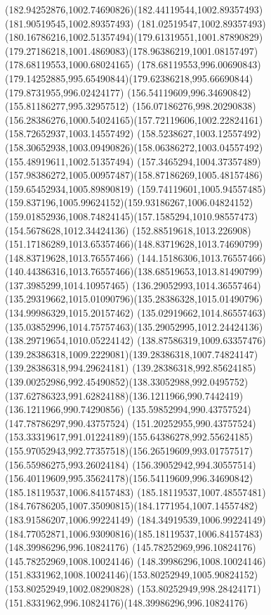 {{	\curveto(182.94252876,1002.74690826)(182.44119544,1002.89357493)(181.90519545,1002.89357493)
	\curveto(181.02519547,1002.89357493)(180.16786216,1002.51357494)(179.61319551,1001.87890829)
	\curveto(179.27186218,1001.4869083)(178.96386219,1001.08157497)(178.68119553,1000.68024165)
	\lineto(178.68119553,996.00690843)
	\curveto(179.14252885,995.65490844)(179.62386218,995.66690844)(179.8731955,996.02424177)
	\moveto(156.54119609,996.34690842)
	\lineto(155.81186277,995.32957512)
	\lineto(156.07186276,998.20290838)
	\curveto(156.28386276,1000.54024165)(157.72119606,1002.22824161)(158.72652937,1003.14557492)
	\curveto(158.5238627,1003.12557492)(158.30652938,1003.09490826)(158.06386272,1003.04557492)
	\lineto(155.48919611,1002.51357494)
	\lineto(157.3465294,1004.37357489)
	\curveto(157.98386272,1005.00957487)(158.87186269,1005.48157486)(159.65452934,1005.89890819)
	\curveto(159.74119601,1005.94557485)(159.837196,1005.99624152)(159.93186267,1006.04824152)
	\curveto(159.01852936,1008.74824145)(157.1585294,1010.98557473)(154.5678628,1012.34424136)
	\curveto(152.88519618,1013.226908)(151.17186289,1013.65357466)(148.83719628,1013.74690799)
	\lineto(148.83719628,1013.76557466)
	\lineto(144.15186306,1013.76557466)
	\curveto(140.44386316,1013.76557466)(138.68519653,1013.81490799)(137.3985299,1014.10957465)
	\curveto(136.29052993,1014.36557464)(135.29319662,1015.01090796)(135.28386328,1015.01490796)
	\lineto(134.99986329,1015.20157462)
	\lineto(135.02919662,1014.86557463)
	\curveto(135.03852996,1014.75757463)(135.29052995,1012.24424136)(138.29719654,1010.05224142)
	\curveto(138.87586319,1009.63357476)(139.28386318,1009.2229081)(139.28386318,1007.74824147)
	\lineto(139.28386318,994.29624181)
	\curveto(139.28386318,992.85624185)(139.00252986,992.45490852)(138.33052988,992.0495752)
	\curveto(137.62786323,991.62824188)(136.1211966,990.7442419)(136.1211966,990.74290856)
	\lineto(135.59852994,990.43757524)
	\lineto(147.78786297,990.43757524)
	\curveto(151.20252955,990.43757524)(153.33319617,991.01224189)(155.64386278,992.55624185)
	\curveto(155.97052943,992.77357518)(156.26519609,993.01757517)(156.55986275,993.26024184)
	\curveto(156.39052942,994.30557514)(156.40119609,995.35624178)(156.54119609,996.34690842)
	\moveto(185.18119537,1006.84157483)
	\lineto(185.18119537,1007.48557481)
	\curveto(184.76786205,1007.35090815)(184.1771954,1007.14557482)(183.91586207,1006.99224149)
	\curveto(184.34919539,1006.99224149)(184.77052871,1006.93090816)(185.18119537,1006.84157483)
	\moveto(148.39986296,996.10824176)
	\lineto(145.78252969,996.10824176)
	\lineto(145.78252969,1008.10024146)
	\lineto(148.39986296,1008.10024146)
	\curveto(151.8331962,1008.10024146)(153.80252949,1005.90824152)(153.80252949,1002.08290828)
	\curveto(153.80252949,998.28424171)(151.8331962,996.10824176)(148.39986296,996.10824176)
}
}
